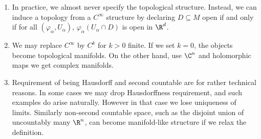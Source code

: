 \documentclass[a4paper]{article}
\begin{document}
\begin{remark}\leavevmode
  \begin{enumerate}
  \item In practice, we almost never specify the topological structure. Instead, we can induce a topology from a \(C^\infty\) structure by declaring \(D \subseteq M\) open if and only if for all \((\varphi_\alpha, U_\alpha)\), \(\varphi_\alpha(U_\alpha \cap D)\) is open in \(\R^d\).
  \item We may replace \(C^\infty\) by \(C^k\) for \(k > 0\) finite. If we set \(k = 0\), the objects become topological manifolds. On the other hand, use \(\C^n\) and holomorphic maps we get complex manifolds.
  \item Requirement of being Hausdorff and second countable are for rather technical reasons. In some cases we may drop Hausdorffness requirement, and such examples do arise naturally. However in that case we lose uniqueness of limits. Similarly non-second countable space, such as the disjoint union of uncountably many \(\R^n\), can become manifold-like structure if we relax the definition.
  \end{enumerate}
\end{remark}
\end{document}

